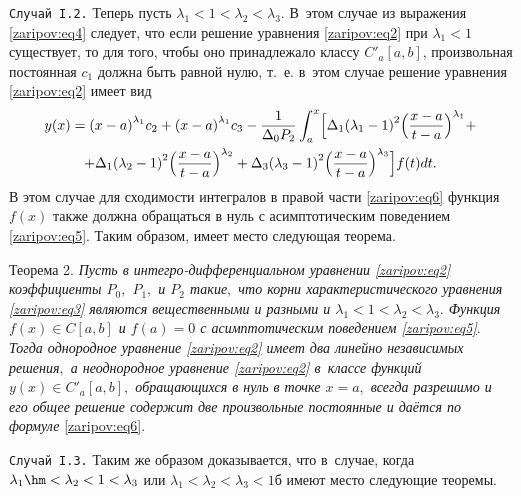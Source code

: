 \smallskip

\texttt{Случай I.2.} 
Теперь пусть $\lambda_1<1< \lambda_2< \lambda_3$. 
В~этом случае из выражения \eqref{zaripov:eq4} следует, что если решение уравнения \eqref{zaripov:eq2} при $\lambda_1<1$  существует, то для того, чтобы оно принадлежало классу $ C'_a[a,b] $, произвольная постоянная $c_1$  должна быть равной нулю, т.~е. в~этом случае решение уравнения \eqref{zaripov:eq2} имеет вид
\begin{multline}
y(x)={(x-a)}^{{\lambda}_{1}}c_2+{(x-a)}^{{\lambda}_{1}}c_3
-\frac{1}{{\Delta_0}P_2}\int _{a}^{x}\Bigl[{\Delta_1}
{\left({{\lambda_1}-1}\right)^2}\Bigl(\frac{x-a}{t-a}\Bigr)^{\lambda_1}+\\
+{\Delta_1}
{\left({{\lambda_2}-1}\right)^2}\Bigl(\frac{x-a}{t-a}\Bigr)^{\lambda_2}+
{\Delta_3}{\left({{\lambda_3}-1}\right)^2}\Bigl(\frac{x-a}{t-a}\Bigr)^{\lambda_3}\Bigr]f(t)dt.\label{zaripov:eq6}
\end{multline}
В этом случае для сходимости интегралов в правой части \eqref{zaripov:eq6} функция $f(x)$ также должна обращаться в нуль с асимптотическим поведением \eqref{zaripov:eq5}.
Таким образом, имеет место следующая теорема.

\smallskip

{\small \sc Теорема 2.} {\it Пусть в интегро-дифференциальном уравнении \eqref{zaripov:eq2} коэффициенты $P_0,$ $P_1,$  и $P_2$  такие$,$ что корни характеристического уравнения \eqref{zaripov:eq3} являются вещественными и разными и $\lambda_1<1< \lambda_2< \lambda_3.$ 
Функция $f(x)\in C[a,b]$   и  $f(a)=0$ с асимптотическим поведением \eqref{zaripov:eq5}$.$ 
Тогда однородное уравнение \eqref{zaripov:eq2} имеет два линейно независимых решения$,$ а неоднородное уравнение \eqref{zaripov:eq2} в~классе функций $y(x)\in C'_a[a,b],$  обращающихся в нуль в точке $x=a,$  всегда разрешимо и его общее решение содержит две произвольные постоянные и даётся по формуле} \eqref{zaripov:eq6}.


\smallskip

\texttt{Случай I.3.}  Таким же образом доказывается, что  в~случае, когда $\lambda_1 \hm < \lambda_2<1< \lambda_3$ или $\lambda_1< \lambda_2< \lambda_3<1$б имеют место следующие теоремы.

\smallskip

